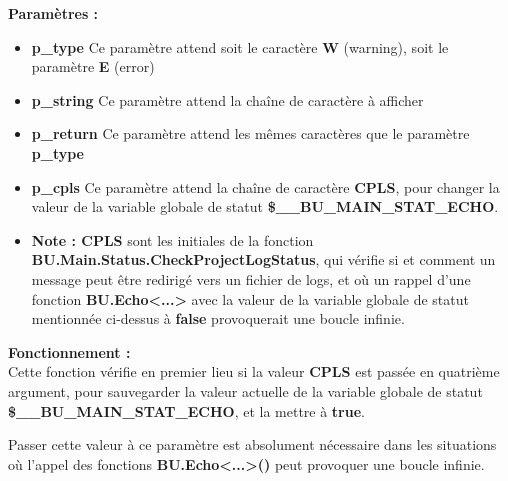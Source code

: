 \documentclass[a4paper,10pt]{article}
\begin{document}
    \begin{justify}
        \textbf{Paramètres :}

        \begin{itemize}
            \item \textbf{\color{vars}p\_type} Ce paramètre attend soit le caractère \textbf{W} (warning), soit le paramètre \textbf{E} (error)\\\mbox{}

            \item \textbf{\color{vars}p\_string} Ce paramètre attend la chaîne de caractère à afficher\\\mbox{}

            \item \textbf{\color{vars}p\_return} Ce paramètre attend les mêmes caractères que le paramètre \textbf{\color{vars}p\_type}\\\mbox{}

            \item \textbf{\color{vars}p\_cpls} Ce paramètre attend la chaîne de caractère \textbf{CPLS}, pour changer la valeur de la variable globale de statut \textbf{\color{vars}\$\_\_BU\_MAIN\_STAT\_ECHO}.\\\mbox{}

            \item \textbf{Note : CPLS} sont les initiales de la fonction \textbf{\color{func}BU.Main.Status.CheckProjectLogStatus}, qui vérifie si et comment un message peut être redirigé vers un fichier de logs, et où un rappel d'une fonction \textbf{\color{func}BU.Echo<...>} avec la valeur de la variable globale de statut mentionnée ci-dessus à \textbf{false} provoquerait une boucle infinie.
        \end{itemize}
    \end{justify}

    \begin{justify}
        \textbf{Fonctionnement :}\\
        Cette fonction vérifie en premier lieu si la valeur \textbf{CPLS} est passée en quatrième argument, pour sauvegarder la valeur actuelle de la variable globale de statut \textbf{\color{vars}\$\_\_BU\_MAIN\_STAT\_ECHO}, et la mettre à \textbf{true}.
    \end{justify}

    \begin{justify}
        Passer cette valeur à ce paramètre est absolument nécessaire dans les situations où l'appel des fonctions \textbf{\color{func}BU.Echo<...>()} peut provoquer une boucle infinie.
    \end{justify}
\end{document}
